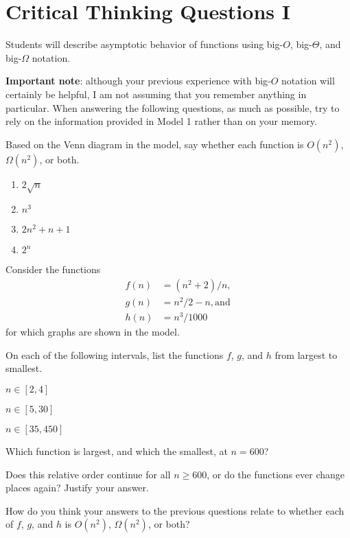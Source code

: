 \documentclass{tufte-handout}
\begin{document}
\newpage
\section{Critical Thinking Questions I}
\begin{objective}
  Students will describe asymptotic behavior of functions
  using big-$O$, big-$\Theta$, and big-$\Omega$ notation.
\end{objective}

\textbf{Important note}: although your previous experience with
big-$O$ notation will certainly be helpful, I am not assuming that you
remember anything in particular.  When answering the following
questions, as much as possible, try to rely on the information
provided in Model 1 rather than on your memory.

\begin{questions}
\item Based on the Venn diagram in the model, say whether each
  function is $O(n^2)$, $\Omega(n^2)$, or both. 
  \begin{enumerate}[label=(\alph*)]
    \item $2\sqrt n$
    \item $n^3$
    \item $2n^2 + n + 1$
    \item $2^n$
    \end{enumerate}
\end{questions}
Consider the functions
\begin{align*}
  f(n) &= (n^2 + 2)/n, \\ g(n) &= n^2/2 - n, \text{and} \\ h(n) &= n^3/1000
\end{align*}
for which graphs are shown in the model.
\begin{questions}
  \item On each of the following intervals, list the functions $f$,
    $g$, and $h$ from largest to smallest.
  \begin{subquestions}
  \item $n \in [2,4]$
  \item $n \in [5,30]$
  \item $n \in [35,450]$
  \end{subquestions}
\item Which function is largest, and which the smallest, at $n = 600$?
\item Does this relative order continue for all $n \geq 600$, or do
  the functions ever change places again?  Justify your answer.
  \newpage
\item How do you think your answers to the previous questions relate
  to whether each of $f$, $g$, and $h$ is $O(n^2)$, $\Omega(n^2)$, or both?
\end{questions}
\end{document}
